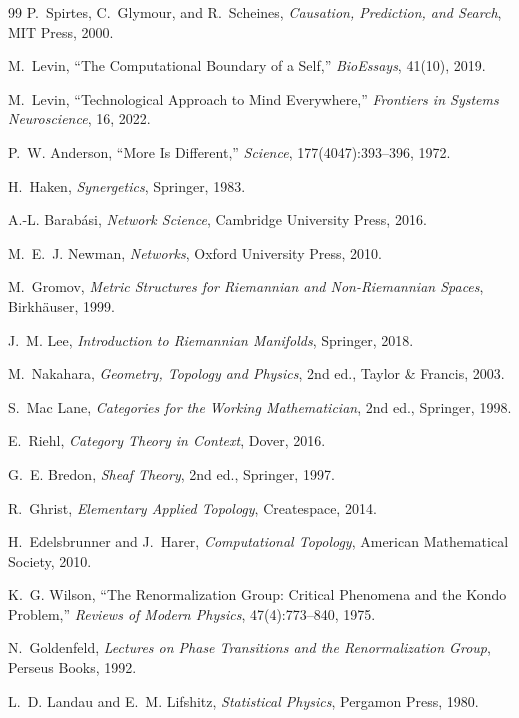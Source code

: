 \documentclass[12pt,a4paper]{article}
\begin{document}
\begin{thebibliography}{99}
P.~Spirtes, C.~Glymour, and R.~Scheines, \textit{Causation, Prediction, and Search}, MIT Press, 2000.

M.~Levin, ``The Computational Boundary of a Self,'' \textit{BioEssays}, 41(10), 2019.

M.~Levin, ``Technological Approach to Mind Everywhere,'' \textit{Frontiers in Systems Neuroscience}, 16, 2022.

P.~W. Anderson, ``More Is Different,'' \textit{Science}, 177(4047):393--396, 1972.

H.~Haken, \textit{Synergetics}, Springer, 1983.

A.-L. Barab\'{a}si, \textit{Network Science}, Cambridge University Press, 2016.

M.~E.~J. Newman, \textit{Networks}, Oxford University Press, 2010.

M.~Gromov, \textit{Metric Structures for Riemannian and Non-Riemannian Spaces}, Birkh\"{a}user, 1999.

J.~M. Lee, \textit{Introduction to Riemannian Manifolds}, Springer, 2018.

M.~Nakahara, \textit{Geometry, Topology and Physics}, 2nd ed., Taylor \& Francis, 2003.

S.~Mac Lane, \textit{Categories for the Working Mathematician}, 2nd ed., Springer, 1998.

E.~Riehl, \textit{Category Theory in Context}, Dover, 2016.

G.~E. Bredon, \textit{Sheaf Theory}, 2nd ed., Springer, 1997.

R.~Ghrist, \textit{Elementary Applied Topology}, Createspace, 2014.

H.~Edelsbrunner and J.~Harer, \textit{Computational Topology}, American Mathematical Society, 2010.

K.~G. Wilson, ``The Renormalization Group: Critical Phenomena and the Kondo Problem,'' \textit{Reviews of Modern Physics}, 47(4):773--840, 1975.

N.~Goldenfeld, \textit{Lectures on Phase Transitions and the Renormalization Group}, Perseus Books, 1992.

L.~D. Landau and E.~M. Lifshitz, \textit{Statistical Physics}, Pergamon Press, 1980.


\end{thebibliography}
\end{document}
